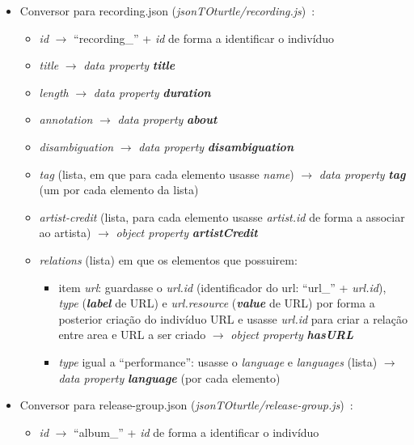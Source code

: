 \documentclass{article}
\begin{document}
\begin{itemize}
\begin{itemize}
        \end{itemize}
    \item Conversor para recording.json (\textit{jsonTOturtle/recording.js})~\cite{mbRec}:
        \begin{itemize}
            \item \textit{id} $\to$ ``recording\_'' + \textit{id} de forma a identificar o indivíduo
            \item \textit{title} $\to$ \textit{data property} \textit{\textbf{title}}
            \item \textit{length} $\to$ \textit{data property} \textit{\textbf{duration}}
            \item \textit{annotation} $\to$ \textit{data property} \textit{\textbf{about}}
            \item \textit{disambiguation} $\to$ \textit{data property} \textit{\textbf{disambiguation}}
            \item \textit{tag} (lista, em que para cada elemento usasse \textit{name}) $\to$ \textit{data property} \textit{\textbf{tag}} (um por cada elemento da lista)
            \item \textit{artist-credit} (lista, para cada elemento usasse \textit{artist.id} de forma a associar ao artista) $\to$ \textit{object property} \textit{\textbf{artistCredit}}
            \item \textit{relations} (lista) em que os elementos que possuirem:
                \begin{itemize}
                    \item item \textit{url}: guardasse o \textit{url.id} (identificador do url: ``url\_'' + \textit{url.id}), \textit{type} (\textit{\textbf{label}} de URL) e \textit{url.resource} (\textit{\textbf{value}} de URL) por forma a posterior criação do indivíduo URL e usasse \textit{url.id} para criar a relação entre area e URL a ser criado $\to$ \textit{object property} \textit{\textbf{hasURL}}
                    \item \textit{type} igual a ``performance'': usasse o \textit{language} e \textit{languages} (lista) $\to$ \textit{data property} \textit{\textbf{language}} (por cada elemento)
                \end{itemize}
        \end{itemize}
    \item Conversor para release-group.json (\textit{jsonTOturtle/release-group.js})~\cite{mbReGp}:
        \begin{itemize}
            \item \textit{id} $\to$ ``album\_'' + \textit{id} de forma a identificar o indivíduo

\end{itemize}
\end{itemize}
\end{document}

